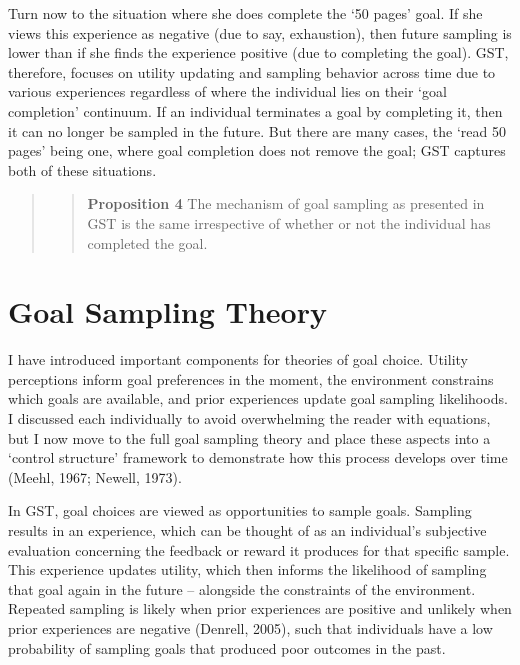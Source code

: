 \documentclass[english,,man]{apa6}
\theoremstyle{definition}
\theoremstyle{definition}
\theoremstyle{definition}
\theoremstyle{remark}
\begin{document}
Turn now to the situation where she does complete the `50 pages' goal.
If she views this experience as negative (due to say, exhaustion), then
future sampling is lower than if she finds the experience positive (due
to completing the goal). GST, therefore, focuses on utility updating and
sampling behavior across time due to various experiences regardless of
where the individual lies on their `goal completion' continuum. If an
individual terminates a goal by completing it, then it can no longer be
sampled in the future. But there are many cases, the `read 50 pages'
being one, where goal completion does not remove the goal; GST captures
both of these situations.

\begin{quote}
\begin{quote}
\textbf{Proposition 4} The mechanism of goal sampling as presented in
GST is the same irrespective of whether or not the individual has
completed the goal.
\end{quote}
\end{quote}

\hypertarget{goal-sampling-theory}{%
\section{Goal Sampling Theory}\label{goal-sampling-theory}}

I have introduced important components for theories of goal choice.
Utility perceptions inform goal preferences in the moment, the
environment constrains which goals are available, and prior experiences
update goal sampling likelihoods. I discussed each individually to avoid
overwhelming the reader with equations, but I now move to the full goal
sampling theory and place these aspects into a `control structure'
framework to demonstrate how this process develops over time (Meehl,
1967; Newell, 1973).

In GST, goal choices are viewed as opportunities to sample goals.
Sampling results in an experience, which can be thought of as an
individual's subjective evaluation concerning the feedback or reward it
produces for that specific sample. This experience updates utility,
which then informs the likelihood of sampling that goal again in the
future -- alongside the constraints of the environment. Repeated
sampling is likely when prior experiences are positive and unlikely when
prior experiences are negative (Denrell, 2005), such that individuals
have a low probability of sampling goals that produced poor outcomes in
the past.
\end{document}
